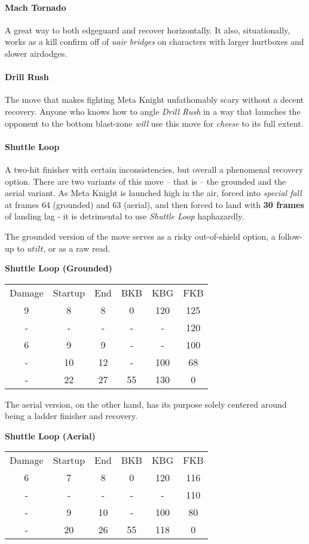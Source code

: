 \paragraph[Neutral Special]{Mach Tornado}
A great way to both edgeguard and recover horizontally. It also, situationally, works as a kill confirm off of \textit{uair bridges} on characters with larger hurtboxes and slower airdodges.
\paragraph[Side Special]{Drill Rush}
The move that makes fighting Meta Knight unfathomably scary without a decent recovery. Anyone who knows how to angle \textit{Drill Rush} in a way that launches the opponent to the bottom blast-zone \textit{will} use this move for \textit{cheese} to its full extent.
\paragraph[Up Special]{Shuttle Loop}
A two-hit finisher with certain inconsistencies, but overall a phenomenal recovery option. There are two variants of this move -- that is -- the grounded and the aerial variant. As Meta Knight is launched high in the air, forced into \textit{special fall} at frames 64 (grounded) and 63 (aerial), and then forced to land with \textbf{30 frames} of landing lag - it is detrimental to use \textit{Shuttle Loop} haphazardly.

The grounded version of the move serves as a risky out-of-shield option, a follow-up to $utilt$, or as a raw read. 
\begin{center}
		\textbf{Shuttle Loop (Grounded)}
		
	\begin{tabular}{| c | c  c | c  c  c |}
		\hline
		Damage	&	Startup		&	End		&	BKB		&	KBG		&	FKB		\\
			9	&		8		&	8		&	0		&	120		&	125		\\
			-	&		-		&	-		&	-		&	-		&	120		\\
			6	&		9		&	9		&	-		&	-		&	100		\\
			-	&		10		&	12		&	-		&	100		&	68		\\
			-	&		22		&	27		&	55		&	130		&	0		\\
		\hline
	\end{tabular}
\end{center}

The aerial version, on the other hand, has its purpose solely centered around being a ladder finisher and recovery.
\begin{center}
	\textbf{Shuttle Loop (Aerial)}
	
	\begin{tabular}{| c | c  c | c  c  c |}
		\hline
		Damage	&	Startup		&	End		&	BKB		&	KBG		&	FKB		\\
		6	&		7			&	8		&	0		&	120		&	116		\\
		-	&		-			&	-		&	-		&	-		&	110		\\
		-	&		9			&	10		&	-		&	100		&	80		\\
		-	&		20			&	26		&	55		&	118		&	0		\\
		\hline
	\end{tabular}
\end{center}

